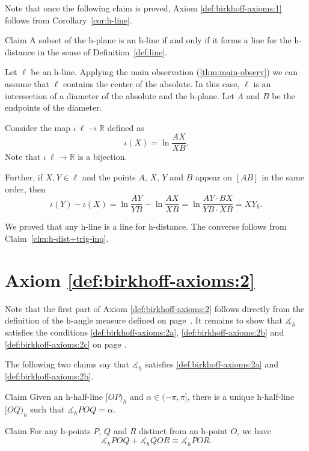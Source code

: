 Note that once the following claim is proved,
Axiom \ref{def:birkhoff-axioms:1} 
follows from Corollary~\ref{cor:h-line}.

\begin{thm}{Claim}
A subset of the h-plane is an h-line if and only if it forms a line for the h-distance in the sense of Definition~\ref{def:line}.
\end{thm}

Let $\ell$ be an h-line.
Applying the main observation (\ref{thm:main-observ}) we can assume that $\ell$ contains the center of the absolute.
In this case, $\ell$ is an intersection of a diameter of the absolute and the h-plane.
Let $A$ and $B$ be the endpoints of the diameter.

Consider the map $\iota\:\ell\to \mathbb{R}$ defined as
$$\iota(X)=\ln \frac{AX}{XB}.$$
Note that $\iota\:\ell\to \mathbb{R}$ is a bijection.

Further, if $X,Y\in \ell$ and the points $A$, $X$, $Y$ and $B$ appear on $[AB]$ in the same order, then
\[\iota(Y)-\iota(X)=\ln \frac{AY}{YB}-\ln \frac{AX}{XB}=\ln \frac{AY\cdot BX}{YB\cdot XB}=XY_h.\]

We proved that any h-line is a line for h-distance.
The converse follows from Claim~\ref{clm:h-dist+trig-inq}.
\qeds


\section*{Axiom \ref{def:birkhoff-axioms:2}}

Note that the first part of Axiom \ref{def:birkhoff-axioms:2} follows directly from the definition of the h-angle measure defined on page~\pageref{h-angle measure}.
It remains to show that $\measuredangle_h$ satisfies the conditions \ref{def:birkhoff-axioms:2a}, \ref{def:birkhoff-axioms:2b} and \ref{def:birkhoff-axioms:2c} on page \pageref{def:birkhoff-axioms:2b}.

The following two claims say that
$\measuredangle_h$ satisfies
 \ref{def:birkhoff-axioms:2a} and \ref{def:birkhoff-axioms:2b}.

\begin{thm}{Claim}\label{clm:h2a}
Given an h-half-line $[O P)_h$ and $\alpha\in(-\pi,\pi]$, there is a unique h-half-line $[O Q)_h$ such that $\measuredangle_h P O Q= \alpha$.
\end{thm}

\begin{thm}{Claim}\label{clm:h2b}
For any h-points $P$, $Q$ and $R$ distinct from an h-point $O$, we have
$$\measuredangle_h P O Q+\measuredangle_h Q O R
\equiv\measuredangle_h P O R.$$

\end{thm}

